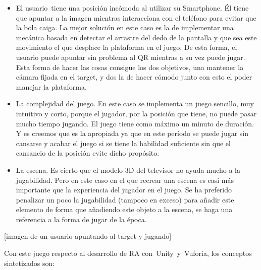 \begin{itemize}
\itemsep1pt\parskip0pt
\item
  El usuario~tiene una posición incómoda al utilizar su Smartphone. Él
  tiene que apuntar a la imagen mientras interacciona con el teléfono
  para evitar que la bola caiga. La mejor solución en este caso es la de
  implementar una mecánica basada en detectar el arrastre del dedo de la
  pantalla y que sea este movimiento el que desplace la plataforma en el
  juego. De esta forma, el usuario puede apuntar sin problema al QR
  mientras a su vez puede jugar. Esta forma de hacer las cosas consigue
  los dos objetivos, una mantener la cámara fijada en el target, y dos
  la de hacer cómodo junto con esto el poder manejar la plataforma.
\item
  La complejidad del juego. En este caso se implementa un juego
  sencillo, muy intuitivo y corto, porque el jugador, por la posición
  que tiene, no puede pasar mucho tiempo jugando. El juego tiene como
  máximo un minuto de duración. Y es creemos que es la apropiada ya que
  en este período se puede jugar sin cansarse y acabar el juego si se
  tiene la habilidad suficiente sin que el cansancio de la posición
  evite dicho propósito.
\item
  La escena. Es cierto que el modelo 3D del televisor no ayuda mucho a
  la jugabilidad. Pero en este caso en el que recrear una escena es casi
  más importante que la experiencia del jugador en el juego. Se ha
  preferido penalizar un poco la jugabilidad (tampoco en exceso) para
  añadir este elemento de forma que añadiendo este objeto a la escena,
  se haga una referencia a la forma de jugar de la época.
\end{itemize}

{[}imagen de un usuario apuntando al target y jugando{]}

Con este juego respecto al desarrollo de RA con~Unity~y~Vuforia, los
conceptos sintetizados son:

